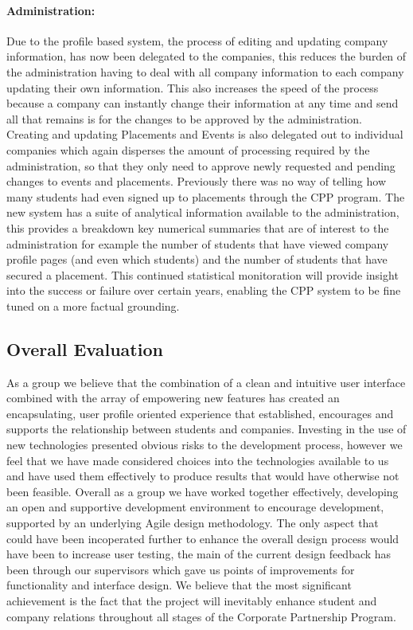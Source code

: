 \paragraph{Administration:}
	Due to the profile based system, the process of editing and updating company information, has now been delegated to the companies, this reduces the burden of the administration having to deal with all company information to each company updating their own information. This also increases the speed of the process because a company can instantly change their information at any time and send all that remains is for the changes to be approved by the administration.
	Creating and updating Placements and Events is also delegated out to individual companies which again disperses the amount of processing required by the administration, so that they only need to approve newly requested and pending changes to events and placements.
	Previously there was no way of telling how many students had even signed up to placements through the CPP program. The new system has a suite of analytical information available to the administration, this provides a breakdown key numerical summaries that are of interest to the administration for example the number of students that have viewed company profile pages (and even which students) and the number of students that have secured a placement. This continued statistical monitoration will provide insight into the success or failure over certain years, enabling the CPP system to be fine tuned on a more factual grounding. 

\subsection{Overall Evaluation}
As a group we believe that the combination of a clean and intuitive user interface combined with the array of empowering new features has created an encapsulating, user profile oriented experience that established, encourages and supports the relationship between students and companies. 
Investing in the use of new technologies presented obvious risks to the development process, however we feel that we have made considered choices into the technologies available to us and have used them effectively to produce results that would have otherwise not been feasible.
Overall as a group we have worked together effectively, developing an open and supportive development environment to encourage development, supported by an underlying Agile design methodology. The only aspect that could have been incoperated further to enhance the overall design process would have been to increase user testing, the main of the current design feedback has been through our supervisors which gave us points of improvements for functionality and interface design. 
We believe that the most significant achievement is the fact that the project will inevitably enhance student and company relations throughout all stages of the Corporate Partnership Program.
